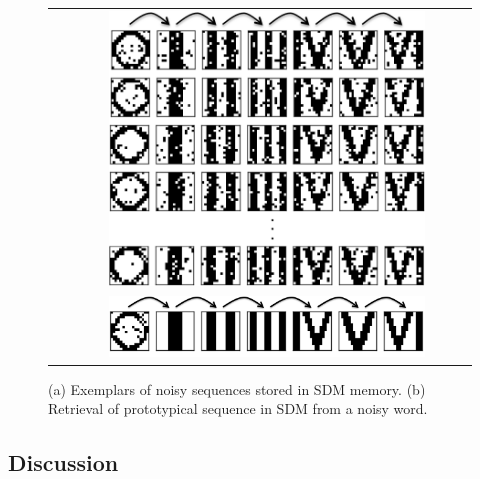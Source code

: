 \documentclass[10pt,letterpaper]{article}
\begin{document}
\begin{center}
\begin{figure}[ht!]
{
	\hfill{}
	\begin{tabular}{ l c }
	\raisebox{4.1in}{(a)} &
		\includegraphics[width=0.8\textwidth]{./figures/exemplarStoredSequences.png} \vspace{25bp} 
		\\
	\raisebox{.6in}{(b)} &
		\includegraphics[width=0.8\textwidth]{./figures/prototypeRetrievedSequence.png} 
	\end{tabular}
}
\hfill{}
\caption{(a) Exemplars of noisy sequences stored in SDM memory. (b) Retrieval of prototypical sequence in SDM from a noisy word.}
\label{sequences}
\end{figure}
\end{center}



\subsection{Discussion}


\end{document}
